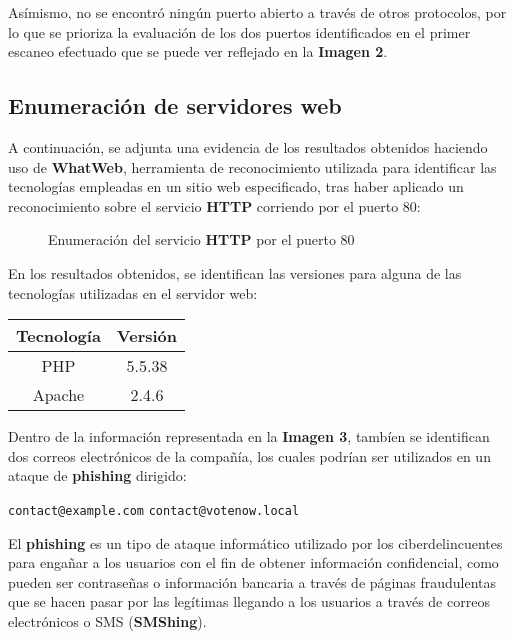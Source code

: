 \documentclass[a4paper]{article} %
\begin{document}
  \justifying

  Asímismo, no se encontró ningún puerto abierto a través de otros protocolos, por lo que se prioriza la evaluación de los dos puertos identificados en el primer escaneo efectuado que se puede ver reflejado en la \textbf{Imagen 2}.

  \clearpage
  \subsection{Enumeración de servidores web}

  A continuación, se adjunta una evidencia de los resultados obtenidos haciendo uso de \textbf{WhatWeb}, herramienta de reconocimiento utilizada para identificar las tecnologías empleadas en un sitio web especificado, tras haber aplicado un reconocimiento sobre el servicio \textbf{HTTP} corriendo por el puerto 80:

   \begin{figure}[h]
    \centering
    \setlength{\fboxrule}{0.8pt}
     \caption{Enumeración del servicio \textbf{HTTP} por el puerto 80}
  \end{figure}

  En los resultados obtenidos, se identifican las versiones para alguna de las tecnologías utilizadas en el servidor web:

  \vspace{0.4cm}
  \centering
  \begin{tabular}{ c | c}
    \textbf{Tecnología} & \textbf{Versión} \\
    \hline
    PHP & 5.5.38 \\
    Apache & 2.4.6
  \end{tabular}
  
  \justifying

  Dentro de la información representada en la \textbf{Imagen 3}, tambíen se identifican dos correos electrónicos de la compañía, los cuales podrían ser utilizados en un ataque de \textbf{phishing} dirigido:

  \vspace{0.3cm}
  \begin{center}
    \texttt{contact@example.com} \qquad \texttt{contact@votenow.local}
  \end{center}

  \vspace{0.3cm}
  \begin{definicion}
    El \textbf{phishing} es un tipo de ataque informático utilizado por los ciberdelincuentes para engañar a los usuarios con el fin de obtener información confidencial, como pueden ser contraseñas o información bancaria a través de páginas fraudulentas que se hacen pasar por las legítimas llegando a los usuarios a través de correos electrónicos o SMS (\textbf{SMShing}).
  \end{definicion}
\end{document}
